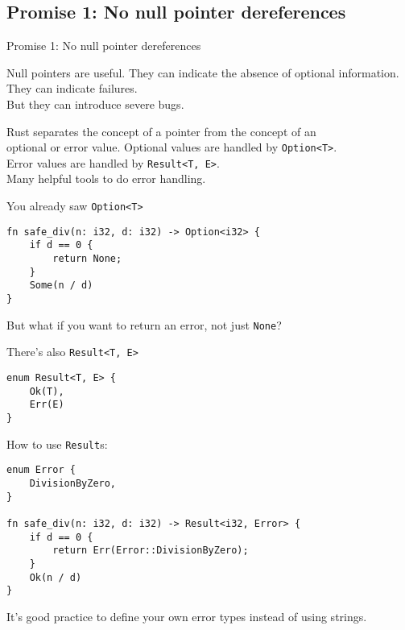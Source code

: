 \subsection{Promise 1: No null pointer dereferences}


\begin{frame}{Promise 1: No null pointer dereferences}

\begin{block}{Null pointers are useful.}
They can indicate the absence of optional information.\\
They can indicate failures.\\
\pause
But they can introduce severe bugs.
\end{block}
\vspace{1em}
\pause
\begin{block}{Rust separates the concept of a pointer from the concept of an\\
		optional or error value.}
	Optional values are handled by \texttt{Option<T>}.\\
  Error values are handled by \texttt{Result<T, E>}.\\
	Many helpful tools to do error handling.
\end{block}

\end{frame}


\begin{frame}[fragile]{You already saw \texttt{Option<T>}}
\begin{verbatim}
fn safe_div(n: i32, d: i32) -> Option<i32> {
    if d == 0 {
        return None;
    }
    Some(n / d)
}
\end{verbatim}
\pause
But what if you want to return an error, not just \texttt{None}?
\end{frame}


\begin{frame}[fragile]{There's also \texttt{Result<T, E>}}
\begin{verbatim}
enum Result<T, E> {
    Ok(T),
    Err(E)
}
\end{verbatim}
\end{frame}


\begin{frame}[fragile]{How to use \texttt{Result}s:}
\begin{verbatim}
enum Error {
    DivisionByZero,
}

fn safe_div(n: i32, d: i32) -> Result<i32, Error> {
    if d == 0 {
        return Err(Error::DivisionByZero);
    }
    Ok(n / d)
}
\end{verbatim}
\pause
It's good practice to define your own error types instead of using strings.
\end{frame}

